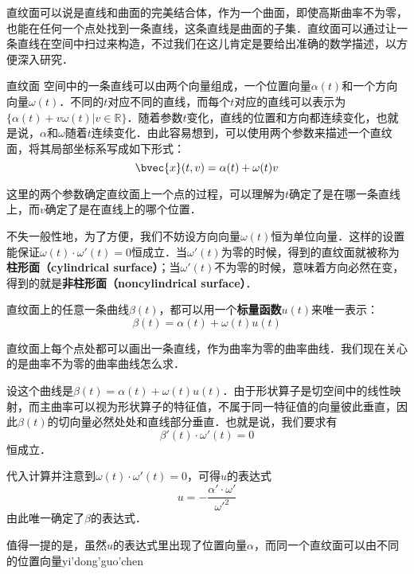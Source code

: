 

直纹面可以说是直线和曲面的完美结合体，作为一个曲面，即使高斯曲率不为零，也能在任何一个点处找到一条直线，这条直线是曲面的子集．直纹面可以通过让一条直线在空间中扫过来构造，不过我们在这儿肯定是要给出准确的数学描述，以方便深入研究．

\begin{definition}{直纹面}
空间中的一条直线可以由两个向量组成，一个位置向量$\alpha(t)$和一个方向向量$\omega(t)$．不同的$t$对应不同的直线，而每个$t$对应的直线可以表示为$\{\alpha(t)+v\omega(t)|v\in\mathbb{R}\}$．随着参数$t$变化，直线的位置和方向都连续变化，也就是说，$\alpha$和$\omega$随着$t$连续变化．由此容易想到，可以使用两个参数来描述一个直纹面，将其局部坐标系写成如下形式：
\begin{equation}
\bvec{x}(t, v)=\alpha(t)+\omega(t)v
\end{equation}
\end{definition}


这里的两个参数确定直纹面上一个点的过程，可以理解为$t$确定了是在哪一条直线上，而$v$确定了是在直线上的哪个位置．

不失一般性地，为了方便，我们不妨设方向向量$\omega(t)$恒为单位向量．这样的设置能保证$\omega(t)\cdot\omega'(t)=0$恒成立．当$\omega'(t)$为零的时候，得到的直纹面就被称为\textbf{柱形面（cylindrical surface）}；当$\omega'(t)$不为零的时候，意味着方向必然在变，得到的就是\textbf{非柱形面（noncylindrical surface）}．

直纹面上的任意一条曲线$\beta(t)$，都可以用一个\textbf{标量函数}$u(t)$来唯一表示：\begin{equation}
\beta(t)=\alpha(t)+\omega(t)u(t)
\end{equation}

直纹面上每个点处都可以画出一条直线，作为曲率为零的曲率曲线．我们现在关心的是曲率不为零的曲率曲线怎么求．

设这个曲线是$\beta(t)=\alpha(t)+\omega(t)u(t)$．由于形状算子是切空间中的线性映射，而主曲率可以视为形状算子的特征值，不属于同一特征值的向量彼此垂直，因此$\beta(t)$的切向量必然处处和直线部分垂直．也就是说，我们要求有
\begin{equation}
\beta'(t)\cdot\omega'(t)=0
\end{equation}
恒成立．

代入计算并注意到$\omega(t)\cdot\omega'(t)=0$，可得$u$的表达式\begin{equation}
u=-\frac{\alpha'\cdot\omega'}{\omega'^2}
\end{equation}
由此唯一确定了$\beta$的表达式．

值得一提的是，虽然$u$的表达式里出现了位置向量$\alpha$，而同一个直纹面可以由不同的位置向量yi'dong'guo'chen




